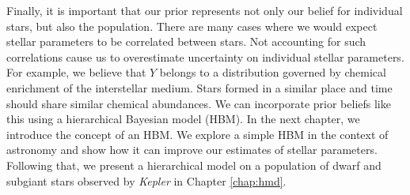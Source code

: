 
Finally, it is important that our prior represents not only our belief for individual stars, but also the population. There are many cases where we would expect stellar parameters to be correlated between stars. Not accounting for such correlations cause us to overestimate uncertainty on individual stellar parameters. For example, we believe that \(Y\) belongs to a distribution governed by chemical enrichment of the interstellar medium. Stars formed in a similar place and time should share similar chemical abundances. We can incorporate prior beliefs like this using a hierarchical Bayesian model (HBM). In the next chapter, we introduce the concept of an HBM. We explore a simple HBM in the context of astronomy and show how it can improve our estimates of stellar parameters. Following that, we present a hierarchical model on a population of dwarf and subgiant stars observed by \emph{Kepler} in Chapter \ref{chap:hmd}.


